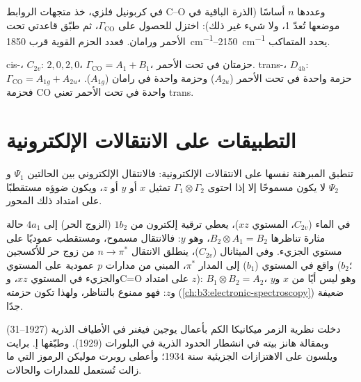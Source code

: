 \begin{method}[عدّ تمددات CO]\label{met:b3:group-theory-applied:co-count}
في كربونيل فلزي، خذ متجهات الروابط C--O وعددها $n$ أساسًا (الذرة الباقية في
موضعها تُعدّ 1، ولا شيء غير ذلك): اختزل للحصول على $\Gamma_{\mathrm{CO}}$، ثم طبّق
قاعدتي تحت الأحمر ورامان. فعدد الحزم القوية قرب
\qtyrange{1850}{2150}{cm^{-1}} يحدد المتماكب.
\end{method}

\begin{example}\label{ex:b3:group-theory-applied:cis-trans}
cis-، $C_{2v}$:  $2, 0, 2, 0$، $\Gamma_{\mathrm{CO}} = A_1 + B_1$،
حزمتان في تحت الأحمر. trans-، $D_{4h}$: $\Gamma_{\mathrm{CO}} = A_{1g} + A_{2u}$، حزمة
واحدة في تحت الأحمر ($A_{2u}$) وحزمة واحدة في رامان ($A_{1g}$). فحزمة CO واحدة في
تحت الأحمر تعني trans.
\end{example}

\section{التطبيقات على الانتقالات الإلكترونية}

تنطبق المبرهنة نفسها على الانتقالات الإلكترونية: فالانتقال الإلكتروني
بين الحالتين $\Psi_1$ و$\Psi_2$ لا يكون مسموحًا إلا إذا احتوى $\Gamma_1\otimes\Gamma_2$
تمثيل $x$ أو $y$ أو $z$، ويكون ضوؤه مستقطبًا على امتداد
ذلك المحور.

\begin{example}\label{ex:b3:group-theory-applied:electronic}
في الماء ($C_{2v}$، المستوي $xz$)، يعطي ترقية إلكترون من $1b_2$ (الزوج الحر)
إلى $4a_1$ حالة مثارة تناظرها $B_2\otimes A_1 = B_2$، وهو $y$:
فالانتقال مسموح، ومستقطب عموديًا على مستوي الجزيء. وفي الميثانال
($C_{2v}$)، ينطلق الانتقال $n\to\pi^*$ من زوج حر للأكسجين واقع في المستوي ($b_1$)
إلى المدار $\pi^*$، المبني من مدارات $p$ عمودية على المستوي
($b_2$؛ والجزيء في المستوي $xz$، وC=O على امتداد $z$): $B_1\otimes B_2 = A_2$،
وهو ليس أيًا من $x$ و$y$ و$z$: فهو ممنوع بالتناظر، ولهذا تكون حزمته
(\cref{ch:b3:electronic-spectroscopy}) ضعيفة جدًا.
\end{example}

\begin{history}
دخلت نظرية الزمر ميكانيكا الكم بأعمال يوجين فيغنر في الأطياف
الذرية (1927--31) وبمقالة هانز بيته في انشطار الحدود الذرية في
البلورات (1929). وطبّقها إ. برايت ويلسون على الاهتزازات الجزيئية سنة
1934؛ وأعطى روبرت موليكن الرموز التي ما زالت تُستعمل للمدارات والحالات.
\end{history}

